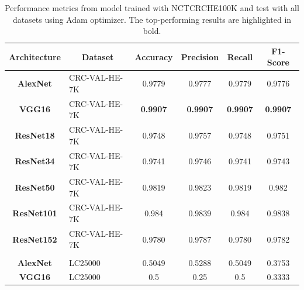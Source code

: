 \begin{table}[t!]
\centering

\caption{Performance metrics from model trained with \gls{NCTCRCHE100K} and test with all datasets using Adam optimizer. The top-performing results are highlighted in bold.}
\label{table_NCTCRCHE100K_adam}

\begin{tabular}{|c|l|c|c|c|c|}
\hline
\textbf{Architecture}  & \multicolumn{1}{c|}{\textbf{Dataset}} & \textbf{Accuracy}          & \textbf{Precision}    & \textbf{Recall}       & \textbf{F1-Score}     \\ \hline
\textbf{AlexNet}       & CRC-VAL-HE-7K                         & 0.9779                & 0.9777                & 0.9779                & 0.9776                \\ \hline
\textbf{VGG16}         & CRC-VAL-HE-7K                         & \textbf{0.9907}                & \textbf{0.9907}                & \textbf{0.9907}                & \textbf{0.9907}                \\ \hline
\textbf{ResNet18}      & CRC-VAL-HE-7K                         & 0.9748                & 0.9757                & 0.9748                & 0.9751                \\ \hline
\textbf{ResNet34}      & CRC-VAL-HE-7K                         & 0.9741                & 0.9746                & 0.9741                & 0.9743                \\ \hline
\textbf{ResNet50}      & CRC-VAL-HE-7K                         & 0.9819                & 0.9823                & 0.9819                & 0.982                 \\ \hline
\textbf{ResNet101}     & CRC-VAL-HE-7K                         & 0.984                 & 0.9839                & 0.984                 & 0.9838                \\ \hline
\textbf{ResNet152}     & CRC-VAL-HE-7K                         & 0.9780                & 0.9787                & 0.9780                & 0.9782                \\ \hline
\multicolumn{1}{|l|}{} &                                       & \multicolumn{1}{l|}{} & \multicolumn{1}{l|}{} & \multicolumn{1}{l|}{} & \multicolumn{1}{l|}{} \\ \hline
\textbf{AlexNet}       & LC25000                               & 0.5049                & 0.5288                & 0.5049                & 0.3753                \\ \hline
\textbf{VGG16}         & LC25000                               & 0.5                   & 0.25                  & 0.5                   & 0.3333                \\ \hline

\end{tabular}
\end{table}
